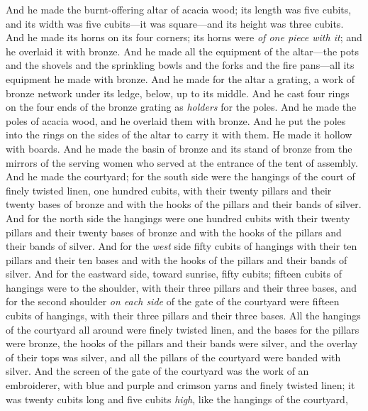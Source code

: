 \begin{biblechapter} %
 And he made the burnt-offering altar of acacia wood; its length was five cubits, and its width was five cubits—it was square—and its height was three cubits.
\verse And he made its horns on its four corners; its horns were \textit{of one piece with it}; and he overlaid it with bronze.
\verse And he made all the equipment of the altar—the pots and the shovels and the sprinkling bowls and the forks and the fire pans—all its equipment he made with bronze.
\verse And he made for the altar a grating, a work of bronze network under its ledge, below, up to its middle.
\verse And he cast four rings on the four ends of the bronze grating as \textit{holders} for the poles.
\verse And he made the poles of acacia wood, and he overlaid them with bronze.
\verse And he put the poles into the rings on the sides of the altar to carry it with them. He made it hollow with boards.
\verse And he made the basin of bronze and its stand of bronze from the mirrors of the serving women who served at the entrance of the tent of assembly.
 And he made the courtyard; for the south side were the hangings of the court of finely twisted linen, one hundred cubits,
\verse with their twenty pillars and their twenty bases of bronze and with the hooks of the pillars and their bands of silver.
\verse And for the north side the hangings were one hundred cubits with their twenty pillars and their twenty bases of bronze and with the hooks of the pillars and their bands of silver.
\verse And for the \textit{west} side fifty cubits of hangings with their ten pillars and their ten bases and with the hooks of the pillars and their bands of silver.
\verse And for the eastward side, toward sunrise, fifty cubits;
\verse fifteen cubits of hangings were to the shoulder, with their three pillars and their three bases,
\verse and for the second shoulder \textit{on each side} of the gate of the courtyard were fifteen cubits of hangings, with their three pillars and their three bases.
\verse All the hangings of the courtyard all around were finely twisted linen,
\verse and the bases for the pillars were bronze, the hooks of the pillars and their bands were silver, and the overlay of their tops was silver, and all the pillars of the courtyard were banded with silver.
\verse And the screen of the gate of the courtyard was the work of an embroiderer, with blue and purple and crimson yarns and finely twisted linen; it was twenty cubits long and five cubits \textit{high}, like the hangings of the courtyard,

\end{biblechapter}
